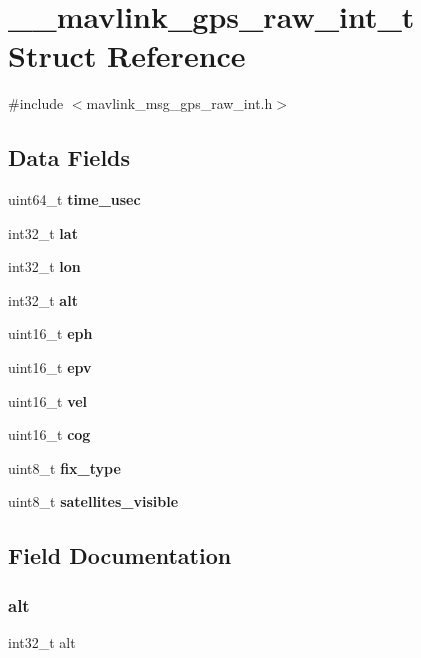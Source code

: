 \section{\+\_\+\+\_\+mavlink\+\_\+gps\+\_\+raw\+\_\+int\+\_\+t Struct Reference}
\label{struct____mavlink__gps__raw__int__t}


{\ttfamily \#include $<$mavlink\+\_\+msg\+\_\+gps\+\_\+raw\+\_\+int.\+h$>$}

\subsection*{Data Fields}
\begin{DoxyCompactItemize}
\item 
uint64\+\_\+t \textbf{ time\+\_\+usec}
\item 
int32\+\_\+t \textbf{ lat}
\item 
int32\+\_\+t \textbf{ lon}
\item 
int32\+\_\+t \textbf{ alt}
\item 
uint16\+\_\+t \textbf{ eph}
\item 
uint16\+\_\+t \textbf{ epv}
\item 
uint16\+\_\+t \textbf{ vel}
\item 
uint16\+\_\+t \textbf{ cog}
\item 
uint8\+\_\+t \textbf{ fix\+\_\+type}
\item 
uint8\+\_\+t \textbf{ satellites\+\_\+visible}
\end{DoxyCompactItemize}


\subsection{Field Documentation}
\mbox{\label{struct____mavlink__gps__raw__int__t_a677cbc2ca7dc4e9f0516bd42110f0062}} 
\subsubsection{alt}
{\footnotesize\ttfamily int32\+\_\+t alt}

\mbox{\label{struct____mavlink__gps__raw__int__t_ae60ed3a2a03ac9f15c444d567211eb39}} 
